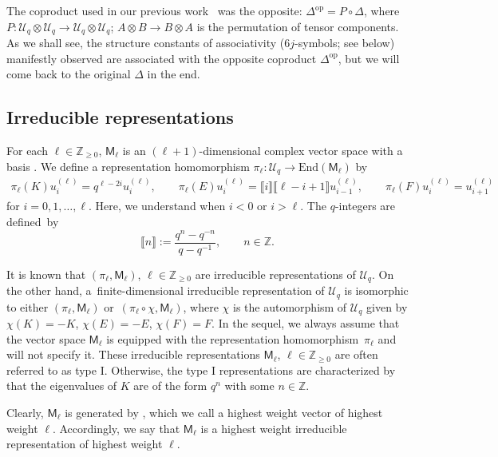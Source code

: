 \documentclass[10pt,a4paper]{amsart}
\numberwithin{equation}{section}
\newcommand{\End}{\mathrm{End}}
\newcommand{\op}{\mathrm{op}}
\newcommand{\bZ}{\mathbb{Z}}
\newcommand{\cU}{\mathcal{U}}
\newcommand{\sfM}{\mathsf{M}}
\newcommand{\qint}[1]{\llbracket #1 \rrbracket}
\newcommand{\UEA}{\cU}
\newcommand{\Uq}{\UEA_{q}}
\newcommand{\QGirrep}[1]{\sfM_{#1}}
\newcommand{\QGirvec}[2]{u^{(#1)}_{#2}}
\newcommand{\QGirmap}[1]{\pi_{#1}}
\newcommand{\QGcoprod}{\Delta}
\begin{document}
\begin{rem}
The coproduct used in our previous work~\cite{KoshidaKytola2022} was the opposite: $\QGcoprod^{\op}=P\circ \QGcoprod$, where
$
 P\colon \Uq\otimes\Uq \to \Uq\otimes \Uq$; $ A\otimes B\to B\otimes A$
is the permutation of tensor components.
As we shall see, the structure constants of associativity ($6j$-symbols; see below) manifestly observed are associated with the opposite coproduct $\QGcoprod^{\op}$, but we will come back to the original $\QGcoprod$ in the end.
\end{rem}

\subsection{Irreducible representations}
For each $\ell\in \bZ_{\geq 0}$, $\QGirrep{\ell}$ is an $(\ell+1)$-dimensional complex vector space with a basis \smash{$\big(\QGirvec{\ell}{i}\big)_{i=0,1,\dots, \ell}$}.
We define a representation homomorphism
$
 \QGirmap{\ell}\colon \Uq\to \End (\QGirrep{\ell})
$
by
\begin{gather*}
 \QGirmap{\ell} (K) \QGirvec{\ell}{i} =q^{\ell-2i}\QGirvec{\ell}{i}, \qquad
 \QGirmap{\ell}(E) \QGirvec{\ell}{i} = \qint{i}\qint{\ell-i+1} \QGirvec{\ell}{i-1},\qquad
 \QGirmap{\ell} (F) \QGirvec{\ell}{i} = \QGirvec{\ell}{i+1}
\end{gather*}
for $i=0,1,\dots,\ell$.
Here, we understand \smash{$\QGirvec{\ell}{i}=0$} when $i<0$ or $i>\ell$.
The $q$-integers are defined~by
\[
 \qint{n}:=\frac{q^{n}-q^{-n}}{q-q^{-1}}, \qquad n\in \bZ.
\]

It is known that $(\QGirmap{\ell},\QGirrep{\ell})$, $\ell\in \bZ_{\geq 0}$ are irreducible representations of $\Uq$.
On the other hand, a~finite-dimensional irreducible representation of $\Uq$ is isomorphic to either $(\QGirmap{\ell},\QGirrep{\ell})$ or~${(\QGirmap{\ell}\circ\chi,\QGirrep{\ell})}$, where $\chi$ is the automorphism of $\Uq$ given by $\chi (K)=-K$, $\chi (E)=-E$, $\chi (F)=F$.
In the sequel, we always assume that the vector space $\QGirrep{\ell}$ is equipped with the representation homomorphism~$\QGirmap{\ell}$ and will not specify it. These irreducible representations $\QGirrep{\ell}$, $\ell\in\bZ_{\geq 0}$ are often referred to as type I.
Otherwise, the type I representations are characterized by that the eigenvalues of $K$ are of the form $q^{n}$ with some $n\in\bZ$.

Clearly, $\QGirrep{\ell}$ is generated by \smash{$\QGirvec{\ell}{0}$}, which we call a highest weight vector of highest weight $\ell$.
Accordingly, we say that $\QGirrep{\ell}$ is a highest weight irreducible representation of highest weight $\ell$.
\end{document}
